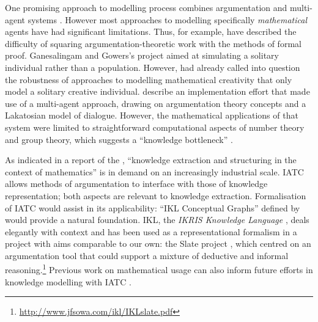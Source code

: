\documentclass[smallextended,oneside]{svjour3}       %
\let\cite\citep
\newcommand\nothing[1]{#1}
\let\paragraph\nothing
\begin{document}
One promising approach to modelling process combines argumentation and multi-agent
systems
\cite{modgil2007towards,maghraby2012automated,Robertson2012}.
However most approaches to modelling specifically \emph{mathematical}
agents have had significant limitations.
%
Thus, for example, \citet{fiedler2007argumentation} have described the difficulty of
squaring argumentation-theoretic work with the methods of formal
proof.  Ganesalingam and Gowers's \citeyearpar{ganesalingam2016fully}
project aimed at simulating a solitary individual rather than a
population.  However, \citet{furse1990did} had already called into question the robustness of approaches to modelling mathematical creativity that only model a solitary creative individual.
\citet{pease2009bridging} describe an implementation effort
that made use of a multi-agent approach, drawing on argumentation
theory concepts and a Lakatosian model of dialogue.  However,
the mathematical applications of that system were limited to
straightforward computational aspects of number theory and group theory, which
suggests a ``knowledge bottleneck''
\cite{saint2016argument,moens2017argumentation}.

\paragraph{As indicated in a report of the \citet[p.~90]{national2014developing}, ``knowledge extraction and structuring in the context of mathematics'' is in demand on an increasingly industrial scale.}
IATC allows methods of argumentation to interface with those of
knowledge representation; both aspects are relevant to knowledge
extraction.  Formalisation of IATC would assist in its
applicability: ``IKL Conceptual Graphs'' defined by
\citet{sowa2008conceptual} would provide a natural foundation.  IKL,
the \emph{IKRIS Knowledge Language} \cite{hayes2006ikl,sowa2008conceptual},
deals elegantly with context and has been used as a representational
formalism in a project with aims comparable to our own: the Slate
project \cite{bringsjord2008slate}, which centred on an argumentation
tool that could support a mixture of deductive and informal
reasoning.\footnote{\url{http://www.jfsowa.com/ikl/IKLslate.pdf}}
Previous work on mathematical usage can also inform future efforts in
knowledge modelling with IATC \cite{trzeciak2012mathematical,wells2003handbook,
  wolska2015students,ginev2011structure}.  
\end{document}
